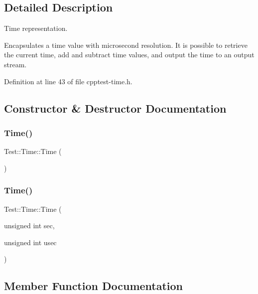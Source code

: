 \subsection{Detailed Description}
Time representation. 

Encapsulates a time value with microsecond resolution. It is possible to retrieve the current time, add and subtract time values, and output the time to an output stream. 

Definition at line 43 of file cpptest-\/time.\+h.



\subsection{Constructor \& Destructor Documentation}
\mbox{\label{class_test_1_1_time_ae5c1089d2eb013c5b908ea95d924b733}} 
\subsubsection{\texorpdfstring{Time()}{Time()}\hspace{0.1cm}{\footnotesize\ttfamily [1/2]}}
{\footnotesize\ttfamily Test\+::\+Time\+::\+Time (\begin{DoxyParamCaption}{ }\end{DoxyParamCaption})}

\mbox{\label{class_test_1_1_time_afdc9c0556b8d71ecd8d621c2512154a5}} 
\subsubsection{\texorpdfstring{Time()}{Time()}\hspace{0.1cm}{\footnotesize\ttfamily [2/2]}}
{\footnotesize\ttfamily Test\+::\+Time\+::\+Time (\begin{DoxyParamCaption}\item[{unsigned int}]{sec,  }\item[{unsigned int}]{usec }\end{DoxyParamCaption})}



\subsection{Member Function Documentation}
\mbox{\label{class_test_1_1_time_a83422a11d27c17a7a4bc52ab14fdb9a3}} 
